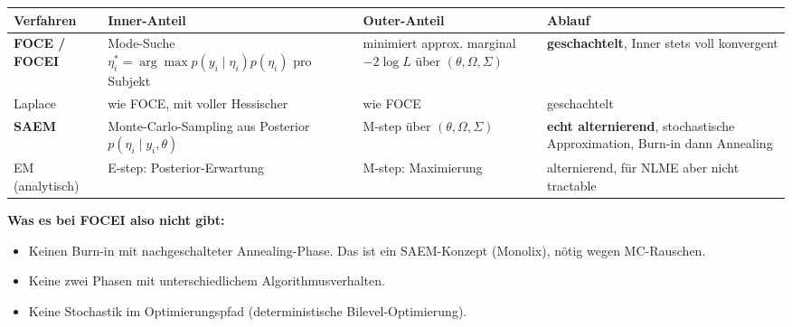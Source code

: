 \documentclass[
]{article}
\newcounter{none} %
\providecommand{\tightlist}{%
  \setlength{\itemsep}{0pt}\setlength{\parskip}{0pt}}
\begin{document}
{\def\LTcaptype{none} %
\begin{longtable}[]{@{}
  >{\raggedright\arraybackslash}p{}
  >{\raggedright\arraybackslash}p{}
  >{\raggedright\arraybackslash}p{}
  >{\raggedright\arraybackslash}p{}@{}}
\toprule\noalign{}
\begin{minipage}[b]{\linewidth}\raggedright
Verfahren
\end{minipage} & \begin{minipage}[b]{\linewidth}\raggedright
Inner-Anteil
\end{minipage} & \begin{minipage}[b]{\linewidth}\raggedright
Outer-Anteil
\end{minipage} & \begin{minipage}[b]{\linewidth}\raggedright
Ablauf
\end{minipage} \\
\midrule\noalign{}
\endhead
\bottomrule\noalign{}
\endlastfoot
\textbf{FOCE / FOCEI} & Mode-Suche
\(\eta_i^* = \arg\max p(y_i\mid\eta_i)p(\eta_i)\) pro Subjekt &
minimiert approx. marginal \(-2\log L\) über \((\theta,\Omega,\Sigma)\)
& \textbf{geschachtelt}, Inner stets voll konvergent \\
Laplace & wie FOCE, mit voller Hessischer & wie FOCE & geschachtelt \\
\textbf{SAEM} & Monte-Carlo-Sampling aus Posterior
\(p(\eta_i\mid y_i,\theta)\) & M-step über \((\theta,\Omega,\Sigma)\) &
\textbf{echt alternierend}, stochastische Approximation, Burn-in dann
Annealing \\
EM (analytisch) & E-step: Posterior-Erwartung & M-step: Maximierung &
alternierend, für NLME aber nicht tractable \\
\end{longtable}
}

\textbf{Was es bei FOCEI also nicht gibt:}

\begin{itemize}
\tightlist
\item
  Keinen Burn-in mit nachgeschalteter Annealing-Phase. Das ist ein
  SAEM-Konzept (Monolix), nötig wegen MC-Rauschen.
\item
  Keine zwei Phasen mit unterschiedlichem Algorithmusverhalten.
\item
  Keine Stochastik im Optimierungspfad (deterministische
  Bilevel-Optimierung).
\end{itemize}
\end{document}
